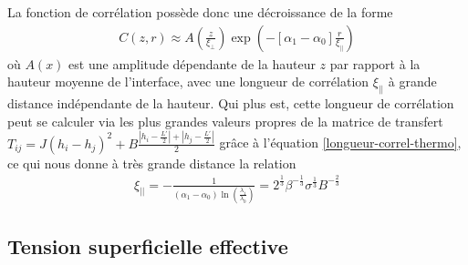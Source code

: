 La fonction de corrélation possède donc une décroissance de la forme
\begin{align}
    C(z,r) \approx A(\frac{z}{\xi_\perp})\exp(-[\alpha_1-\alpha_0] \frac{r}{\xi_{||}})
\end{align}
où $A(x)$ est une amplitude dépendante de la hauteur $z$ par rapport à la hauteur moyenne de l'interface, avec une longueur de corrélation  $\xi_{||}$ à grande distance indépendante de la hauteur. Qui plus est, cette longueur de corrélation peut se calculer via les plus grandes valeurs propres de la matrice de transfert $T_{ij} = J (h_i-h_j)^2 + B \frac{|h_i-\frac{L'}{2}|+|h_j-\frac{L'}{2}|}{2}$ grâce à l'équation \ref{longueur-correl-thermo}, ce qui nous donne à très grande distance la relation
\begin{align}
    \xi_{||} = -  \frac{1}{(\alpha_1-\alpha_0) \ln\left(\frac{\lambda_1}{\lambda_0} \right)} = 2^\frac{1}{3}   \beta^{-\frac{1}{3}} \sigma^{\frac{1}{3}}B^{-\frac{2}{3}}
    \label{xi_parallel}
\end{align}

    \subsection{Tension superficielle effective}

